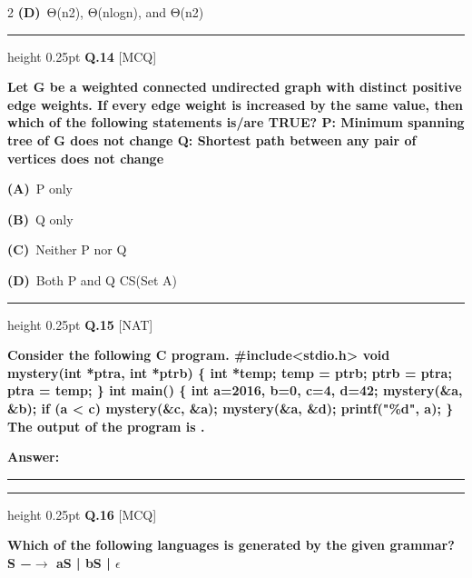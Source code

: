 \documentclass[a4paper,10pt,twoside]{article}
\begin{document}
\begin{multicols}{2}
\textbf{(D)}~Θ(n2), Θ(nlogn), and Θ(n2)
\par\vspace{6pt}\hrule height 0.25pt\vspace{6pt}
\noindent\textbf{Q.14} \hfill {\footnotesize\textsf{[MCQ]}}
\par\vspace{2pt}
{\bfseries Let G be a weighted connected undirected graph with distinct positive edge weights. If every
edge weight is increased by the same value, then which of the following statements is/are
TRUE?
P: Minimum spanning tree of G does not change
Q: Shortest path between any pair of vertices does not change \par}
\par\vspace{2pt}\noindent
\textbf{(A)}~P only\par\vspace{2pt}\noindent
\textbf{(B)}~Q only\par\vspace{2pt}\noindent
\textbf{(C)}~Neither P nor Q\par\vspace{2pt}\noindent
\textbf{(D)}~Both P and Q \newline CS(Set A)
\par\vspace{6pt}\hrule height 0.25pt\vspace{6pt}
\noindent\textbf{Q.15} \hfill {\footnotesize\textsf{[NAT]}}
\par\vspace{2pt}
{\bfseries Consider the following C program.
\#include<stdio.h>
void mystery(int *ptra, int *ptrb) \{
int *temp;
temp = ptrb;
ptrb = ptra;
ptra = temp;
\}
int main() \{
int a=2016, b=0, c=4, d=42;
mystery(\&a, \&b);
if (a < c)
mystery(\&c, \&a);
mystery(\&a, \&d);
printf("\%d\n", a);
\}
The output of the program is
. \par}
\par\vspace{3pt}\noindent\textbf{Answer:} \rule{3.2cm}{0.4pt}
\par\vspace{6pt}\hrule height 0.25pt\vspace{6pt}
\noindent\textbf{Q.16} \hfill {\footnotesize\textsf{[MCQ]}}
\par\vspace{2pt}
{\bfseries Which of the following languages is generated by the given grammar?
S
−$\to$
aS | bS | $\epsilon$ \par}

\end{multicols}
\end{document}

